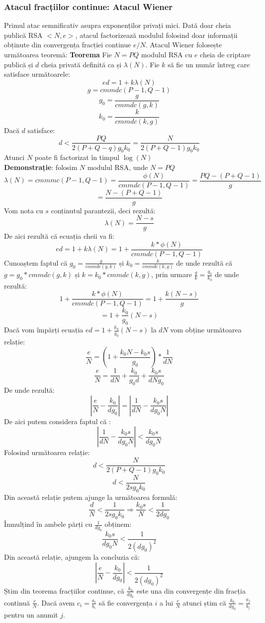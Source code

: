 \documentclass[12]{report}
\begin{document}
\subsubsection{Atacul fracțiilor continue: Atacul Wiener}
Primul atac semnificativ asupra exponenților privați mici. Dată doar cheia publică RSA $<N,e>$, atacul factorizează modulul folosind doar informații obținute din convergența fracției continue $e/N$. Atacul Wiener folosește următoarea teoremă:
\textbf{Teorema} Fie $N=PQ$ modulul RSA cu $e$ cheia de criptare publică și $d$ cheia privată definită ca și $\lambda(N)$. Fie $k$ să fie un număr întreg care satisface următoarele:
$$ ed=1+k \lambda(N)$$
$$ g=cmmdc(P-1,Q-1) $$
$$g_0=\frac{g}{cmmdc(g,k)}$$
$$k_0=\frac{k}{cmmdc(k,g)}$$
Dacă $d$ satisface:
$$ d< \frac{PQ}{2(P+Q-q)g_0k_0} = \frac{N}{2(P+Q-1)g_0k_0}$$
Atunci $N$ poate fi factorizat în timpul $\log(N)$ \\
\textbf{Demonstrație}: folosim $N$ modulul RSA, unde $N=PQ$
$$ \lambda(N)=cmmmc(P-1,Q-1)=\frac{\phi(N)}{cmmdc(P-1,Q-1)}=\frac{PQ - (P+Q-1)}{g}$$
$$ = \frac{N - (P+Q-1)}{g}$$
Vom nota cu $s$ conținutul parantezii, deci rezultă:
$$ \lambda(N) = \frac{N-s}{g}$$
De aici rezultă că ecuația cheii va fi:
$$ed = 1 +k \lambda(N)= 1+ \frac{k* \phi(N)}{cmmdc(P-1,Q-1)} $$
Cunoaștem faptul că  $g_0 = \frac{g}{cmmdc(g,k)}$ și $k_0=\frac{k}{cmmdc(k,g)}$ de unde rezultă că $g=g_0 * cmmdc(g,k)$ și $k=k_0 * cmmdc(k,g)$, prin urmare $\frac{g}{k} = \frac{g_0}{k_0}$ de unde rezultă:
$$ 1+ \frac{k* \phi(N)}{cmmdc(P-1,Q-1)} = 1+ \frac{k (N-s)}{g} $$
$$ = 1+ \frac{k_0}{g_0} (N-s)$$
Dacă vom împărți ecuația $ed= 1+ \frac{k_0}{g_0} (N-s)$ la $dN$ vom obține următoarea relație:
$$ \frac{e}{N} = \left(  1+ \frac{k_0N - k_0s}{g_0}   \right) * \frac{1}{dN} $$
$$ \frac{e}{N} = \frac{1}{dN} + \frac{k_0}{g_0 d} +\frac{k_0s}{dNg_0}$$
De unde rezultă:
$$ \left |  \frac{e}{N} - \frac{k_0}{dg_0} \right| = \left| \frac{1}{dN} - \frac{k_0s}{dg_0N} \right| $$
De aici putem considera faptul că :
$$ \left| \frac{1}{dN} - \frac{k_0s}{dg_0N} \right| < \frac{k_0s}{dg_0N}$$
Folosind următoarea relație:
$$ d< \frac{N}{2(P+Q-1)g_0k_0}  $$
$$ d < \frac{N}{2sg_0k_0}$$
Din această relație putem ajunge la următoarea formulă:
$$ \frac{d}{N} < \frac{1}{2sg_0k_0} \Rightarrow \frac{k_0s}{N} < \frac{1}{2dg_0}$$
Înmulțind în ambele părți cu $\frac{1}{dg_0}$ obținem:
$$ \frac{k_0s}{dg_0N} < \frac{1}{2(dg_0)^2}$$
Din această relație, ajungem la concluzia că:
$$ \left| \frac{e}{N} - \frac{k_0}{dg_0} \right| < \frac{1}{2(dg_0)^2}$$
Știm din teorema fracțiilor continue, că $\frac{k_0}{dg_0}$ este una din convergențe din fracția continuă $\frac{e}{N}$. Dacă avem $c_i = \frac{a_i}{b_i}$ să fie convergența $i$ a lui $\frac{e}{N}$ atunci știm că $\frac{k_0}{dg_0} = \frac{a_j}{b_j}$ pentru un anumit $j$. \\
\end{document}
